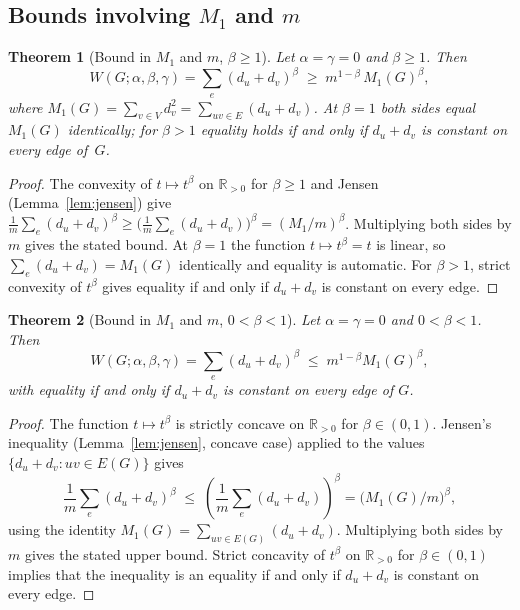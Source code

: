 \documentclass[11pt,a4paper]{article}
\newtheorem{theorem}{Theorem}[section]
\theoremstyle{definition}
\newcommand{\Wuzi}{W(G;\alpha,\beta,\gamma)}
\begin{document}
\subsection{Bounds involving $M_1$ and $m$}

\begin{theorem}[Bound in $M_1$ and $m$, $\beta\ge 1$]\label{thm:m1_bound}
Let $\alpha=\gamma=0$ and $\beta\ge 1$. Then
\[
\Wuzi=\sum_{e}(d_u+d_v)^{\beta}\;\ge\; m^{1-\beta}\,M_1(G)^{\beta},
\]
where $M_1(G)=\sum_{v\in V}d_v^{2}=\sum_{uv\in E}(d_u+d_v)$.
At $\beta = 1$ both sides equal $M_1(G)$ identically; for
$\beta > 1$ equality holds if and only if $d_u + d_v$ is constant
on every edge of~$G$.
\end{theorem}

\begin{proof}
The convexity of $t\mapsto t^\beta$ on $\mathbb{R}_{>0}$ for
$\beta\ge 1$ and Jensen (Lemma~\ref{lem:jensen}) give
$\frac{1}{m}\sum_e(d_u+d_v)^\beta\ge
\bigl(\frac{1}{m}\sum_e(d_u+d_v)\bigr)^\beta=(M_1/m)^\beta$.
Multiplying both sides by $m$ gives the stated bound. At
$\beta = 1$ the function $t \mapsto t^\beta = t$ is linear, so
$\sum_e (d_u + d_v) = M_1(G)$ identically and equality is
automatic. For $\beta > 1$, strict convexity of $t^\beta$ gives
equality if and only if $d_u + d_v$ is constant on every edge.
\end{proof}

\begin{theorem}[Bound in $M_1$ and $m$, $0<\beta<1$]
\label{thm:m1_concave}
Let $\alpha=\gamma=0$ and $0<\beta<1$. Then
\[
\Wuzi=\sum_{e}(d_u+d_v)^{\beta}\;\le\; m^{1-\beta}M_1(G)^{\beta},
\]
with equality if and only if $d_u + d_v$ is constant on every edge
of $G$.
\end{theorem}

\begin{proof}
The function $t \mapsto t^\beta$ is strictly concave on
$\mathbb{R}_{>0}$ for $\beta \in (0, 1)$. Jensen's inequality
(Lemma~\ref{lem:jensen}, concave case) applied to the values
$\{d_u + d_v : uv \in E(G)\}$ gives
\[
\frac{1}{m} \sum_e (d_u + d_v)^\beta
\;\le\;
\left( \frac{1}{m} \sum_e (d_u + d_v) \right)^{\!\beta}
= \bigl( M_1(G) / m \bigr)^{\beta},
\]
using the identity $M_1(G) = \sum_{uv \in E(G)} (d_u + d_v)$.
Multiplying both sides by $m$ gives the stated upper bound.
Strict concavity of $t^\beta$ on $\mathbb{R}_{>0}$ for
$\beta \in (0, 1)$ implies that the inequality is an equality if
and only if $d_u + d_v$ is constant on every edge.
\end{proof}
\end{document}
